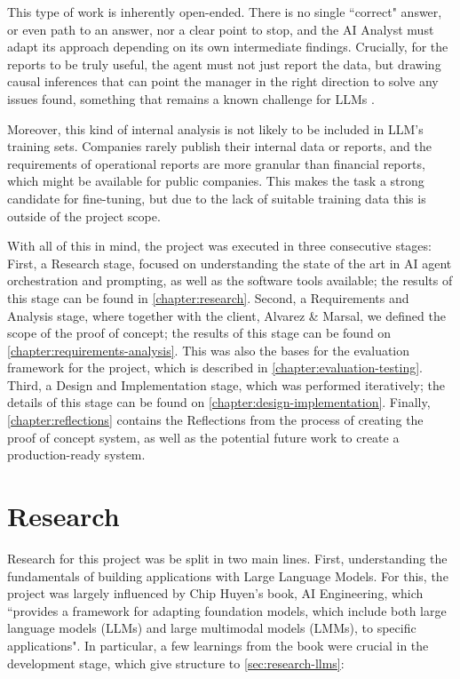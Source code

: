 \documentclass[a4paper]{report}
\begin{document}
This type of work is inherently open-ended. There is no single ``correct" answer, or even path to an answer, nor a clear point to stop, and the AI Analyst must adapt its approach depending on its own intermediate findings. Crucially, for the reports to be truly useful, the agent must not just report the data, but drawing causal inferences that can point the manager in the right direction to solve any issues found, something that remains a known challenge for LLMs \cite{llmcausalreasoning2024}.

Moreover, this kind of internal analysis is not likely to be included in LLM's training sets. Companies rarely publish their internal data or reports, and the requirements of operational reports are more granular than financial reports, which might be available for public companies. This makes the task a strong candidate for fine-tuning, but due to the lack of suitable training data this is outside of the project scope.

With all of this in mind, the project was executed in three consecutive stages: First, a Research stage, focused on understanding the state of the art in AI agent orchestration and prompting, as well as the software tools available; the results of this stage can be found in \autoref{chapter:research}. Second, a Requirements and Analysis stage, where together with the client, Alvarez \& Marsal, we defined the scope of the proof of concept; the results of this stage can be found on \autoref{chapter:requirements-analysis}. This was also the bases for the evaluation framework for the project, which is described in \autoref{chapter:evaluation-testing}. Third, a Design and Implementation stage, which was performed iteratively; the details of this stage can be found on \autoref{chapter:design-implementation}. Finally, \autoref{chapter:reflections} contains the Reflections from the process of creating the proof of concept system, as well as the potential future work to create a production-ready system.

\chapter{Research}
\label{chapter:research}

Research for this project was be split in two main lines. First, understanding the fundamentals of building applications with Large Language Models. For this, the project was largely influenced by Chip Huyen's book, AI Engineering, which ``provides a framework for adapting foundation models, which include both large language models (LLMs) and large multimodal models (LMMs), to specific applications"\cite{aiebook2025}. In particular, a few learnings from the book were crucial in the development stage, which give structure to \autoref{sec:research-llms}:
\end{document}
